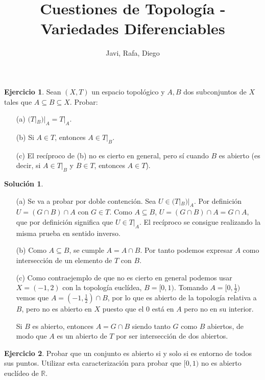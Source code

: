 \documentclass{article}
\theoremstyle{plain}
\theoremstyle{definition}
\newtheorem{exercise}{Ejercicio}
\newtheorem*{sol*}{Solución}
\newcommand{\R}{\mathbb{R}}
\begin{document}
\title{Cuestiones de Topología - Variedades Diferenciables}
\author{Javi, Rafa, Diego}
\maketitle

\begin{exercise}

Sean $(X,T)$ un espacio topológico y $A,B$ dos subconjuntos de $X$ tales que $A\subseteq B\subseteq X$. Probar:
\begin{itemize}
\item[(a)] $(T|_B)|_A=T|_A$.
\item[(b)] Si $A\in T$, entonces $A\in T|_B$.
\item[(c)] El recíproco de (b) no es cierto en general, pero sí cuando $B$ es abierto (es decir, si $A\in T|_B$ y $B\in T$, entonces $A\in T$).
\end{itemize}

\end{exercise}
\begin{sol*}\
\begin{itemize}
\item[(a)] Se va a probar por doble contención. Sea $U\in (T|_B)|_A$. Por definición $U= (G\cap B)\cap A$ con $G\in T$. Como $A\subseteq B$, $U=(G\cap B)\cap A=G\cap A$, que por definición significa que $U\in T|_A$. El recíproco se consigue realizando la misma prueba en sentido inverso. 
\item[(b)] Como $A\subseteq B$, se cumple $A=A\cap B$. Por tanto podemos expresar $A$ como intersección de un elemento de $T$ con $B$.
\item[(c)] Como contraejemplo de que no es cierto en general podemos usar $X=(-1,2)$ con la topología euclídea, $B=[0,1)$. Tomando $A=[0,\frac{1}{2})$ vemos que $A=(-1,\frac{1}{2})\cap B$, por lo que es abierto de la topología relativa a $B$, pero no es abierto en $X$ puesto que el $0$ está en $A$ pero no en su interior.

Si $B$ es abierto, entonces $A=G\cap B$ siendo tanto $G$ como $B$ abiertos, de modo que $A$ es un abierto de $T$ por ser intersección de dos abiertos.
\end{itemize}

\end{sol*}

\begin{exercise}\label{2}
Probar que un conjunto es abierto si y solo si es entorno de todos sus puntos. Utilizar esta caracterización para probar que $[0,1)$ no es abierto euclídeo de $\R$.
\end{exercise}
\end{document}

